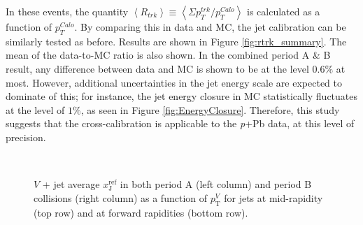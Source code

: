 \documentclass[NOTE, atlasdraft=true, texlive=2016, USenglish]{\ATLASLATEXPATH atlasdoc}
\begin{document}
In these events, the quantity $\left<R_{trk}\right> \equiv \left<\Sigma p_{T}^{trk} / p_{T}^{Calo}\right>$ is calculated as a function of $p_{T}^{Calo}$. By comparing this in data and MC, the jet calibration can be similarly tested as before. Results are shown in Figure \ref{fig:rtrk_summary}. The mean of the data-to-MC ratio is also shown. In the combined period A \& B result, any difference between data and MC is shown to be at the level $0.6\%$ at most. However, additional uncertainties in the jet energy scale are expected to dominate of this; for instance, the jet energy closure in MC statistically fluctuates at the level of $1\%$, as seen in Figure \ref{fig:EnergyClosure}. Therefore, this study suggests that the cross-calibration is applicable to the \textit{p}+Pb data, at this level of precision.


\begin{figure}[htbp]
	\centering
	 \\
	\caption{$V$ + jet average $x_{\text{J}}^{\text{ref}}$ in both period A (left column) and period B collisions (right column) as a function of $p_{\text{T}}^{V}$ for jets at mid-rapidity (top row) and at forward rapidities (bottom row).}
	\label{fig:v_xjref_dataOverMC_pT}
\end{figure}
\end{document}
